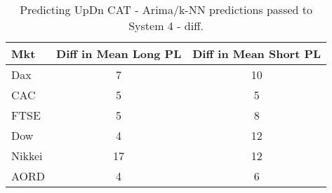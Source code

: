 \begin{table}[ht]
\centering
\caption[Predicting UpDn CAT - Arima/k-NN predictions passed to System 4 - ]{Predicting UpDn CAT - Arima/k-NN predictions passed to System 4 - diff.} 
\label{tab:chp_ts:pUD_CAT_arima_knn_sys_diff}
\begin{tabular}{lcc}
  \toprule Mkt & Diff in Mean Long PL & Diff in Mean Short PL \\ 
  \midrule Dax & 7 & 10 \\ 
  CAC & 5 & 5 \\ 
  FTSE & 5 & 8 \\ 
  Dow & 4 & 12 \\ 
  Nikkei & 17 & 12 \\ 
  AORD & 4 & 6 \\ 
   \bottomrule \end{tabular}
\end{table}
